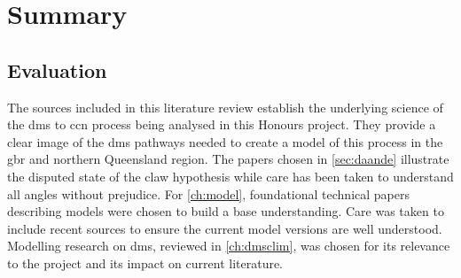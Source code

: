 \chapter{Summary}
\label{ch:summ}


\section{Evaluation}
\label{sec:eval}

	The sources included in this literature review establish the underlying science of the \gls{dms} to \gls{ccn} process being analysed in this Honours project. They provide a clear image of the \gls{dms} pathways needed to create a model of this process in the \gls{gbr} and northern Queensland region. The papers chosen in \cref{sec:daande} illustrate the disputed state of the \gls{claw} hypothesis while care has been taken to understand all angles without prejudice. For \cref{ch:model}, foundational technical papers describing models were chosen to build a base understanding. Care was taken to include recent sources to ensure the current model versions are well understood. Modelling research on \gls{dms}, reviewed in \cref{ch:dmsclim}, was chosen for its relevance to the project and its impact on current literature.






